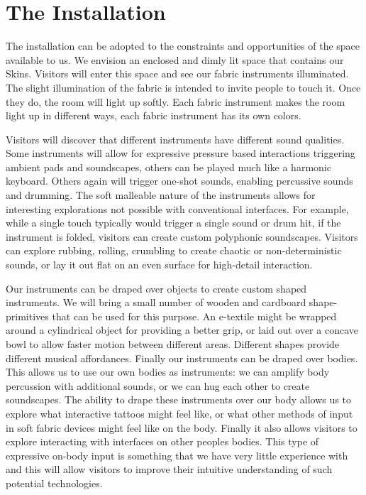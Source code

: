 \documentclass{sigchi-ext}
\begin{document}
\section{The Installation}
The installation can be adopted to the constraints and opportunities of the space available to us. We envision an enclosed and dimly lit space that contains our Skins. Visitors will enter this space and see our fabric instruments illuminated. The slight illumination of the fabric is intended to invite people to touch it. Once they do, the room will light up softly. Each fabric instrument makes the room light up in different ways, each fabric instrument has its own colors.

Visitors will discover that different instruments have different sound qualities. Some instruments will allow for expressive pressure based interactions triggering ambient pads and soundscapes, others can be played much like a harmonic keyboard. Others again will trigger one-shot sounds, enabling percussive sounds and drumming. The soft malleable nature of the instruments allows for interesting explorations not possible with conventional interfaces. For example, while a single touch typically would trigger a single sound or drum hit, if the instrument is folded, visitors can create custom polyphonic soundscapes. Visitors can explore rubbing, rolling, crumbling to create chaotic or non-deterministic sounds, or lay it out flat on an even surface for high-detail interaction.

Our instruments can be draped over objects to create custom shaped instruments. We will bring a small number of wooden and cardboard shape-primitives that can be used for this purpose. An e-textile might be wrapped around a cylindrical object for providing a better grip, or laid out over a concave bowl to allow faster motion between different areas. Different shapes provide different musical affordances.
Finally our instruments can be draped over bodies. This allows us to use our own bodies as instruments: we can amplify body percussion with additional sounds, or we can hug each other to create soundscapes. The ability to drape these instruments over our body allows us to explore what interactive tattoos might feel like, or what other methods of input in soft fabric devices might feel like on the body. Finally it also allows visitors to explore interacting with interfaces on other peoples bodies. This type of expressive on-body input is something that we have very little experience with and this will allow visitors to improve their intuitive understanding of such potential technologies.
\end{document}
